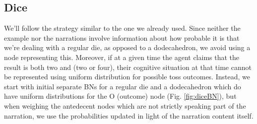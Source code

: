 \documentclass[10pt,]{scrartcl}
\begin{document}
\begin{table}[H]
\centering
{}
\end{table}

\subsection{Dice}\label{dice-1}

We'll follow the strategy similar to the one we already used. Since
neither the example nor the narrations involve information about how
probable it is that we're dealing with a regular die, as opposed to a
dodecahedron, we avoid using a node representing this. Moreover, if at a
given time the agent claims that the result is both two and (two or
four), their cognitive situation at that time cannot be represented
using uniform distribution for possible toss outcomes. Instead, we start
with initial separate BNs for a regular die and a dodecahedron which do
have uniform distributions for the \textsf{O} (outcome) node (Fig.
\ref{fig:diceBN}), but when weighing the antedecent nodes which are not
strictly speaking part of the narration, we use the probabilities
updated in light of the narration content itself.
\end{document}

